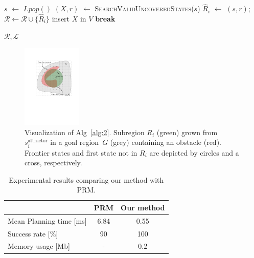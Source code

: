 \documentclass[letterpaper, 10 pt, conference]{ieeeconf}  %
\newcommand{\calL}{\ensuremath{\mathcal{L}}\xspace}
\newcommand{\calR}{\ensuremath{\mathcal{R}}\xspace}
\newcommand{\sAttract}{\ensuremath{s^{\text{attractor}}_i}\xspace}
\begin{document}
\begin{algorithm}[t]
\begin{algorithmic}[1]
\vspace{2mm}        
        
         \label{alg:1:iv_loop}
            \State $s$ $\leftarrow$ $I.pop()$
			\If {$\nexists R \in \calR$ s.t. $s \in R$ }      
\State $(X, r)$ $\leftarrow$ \textsc{SearchValidUncoveredStates}($s$)
                \State $\hat{R}_i$ $\leftarrow$ $(s,r)$;
				\hspace{2mm}
				$\calR \leftarrow \calR \cup \{ \hat{R}_i \}$   \label{alg:1:iv_region}
                    \label{alg:1:x_states}
                    \State insert $X$ in $V$
                    \State \textbf{break} \label{alg:1:break}
                \EndIf
            \EndIf
        \EndWhile
    \EndWhile

  \vspace{2mm}

  \State \Return $\calR, \calL$
\EndProcedure
\end{algorithmic}
\end{algorithm}

\begin{figure}[tb]
  \centering
  	\includegraphics[width=0.25\textwidth]{Alg2.pdf}
  \caption{
  Visualization of Alg~\ref{alg:2}. Subregion $R_i$ (green) grown from $\sAttract$ in a goal region~$G$ (grey) containing an obstacle (red).
  Frontier states  and first state not in $R_i$ are depicted by circles and a cross, respectively.
}
   	\label{fig:alg2}
 \vspace{-5mm}
\end{figure}

\begin{table}[tb]
  \begin{center}
    \begin{tabular}{ l c c }
       & \textsf{PRM} & Our method \\ 
     \hline
     Mean Planning time [ms]& 6.84 	& 0.55 \\  
     Success rate [$\%$]	& 90 	& 100 \\
     Memory usage [Mb] 		& - 	& 0.2 \\
    \end{tabular}
    \caption{Experimental results comparing our method with \textsf{PRM}.}
    \label{tab:stats}
  \end{center}
\end{table}
\end{document}
